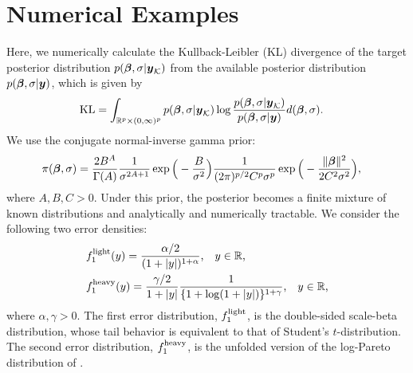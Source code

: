 \documentclass[12pt]{article}
\def\si{{\sigma}}
\def\Ga{\Gamma}
\def\al{{\alpha}}
\def\ga{{\gamma}}
\def\si{{\sigma}}
\def\Ga{{\Gamma}}
\def\non{{\nonumber}}
\def\Kc{{\cal K}}
\def\al{{\alpha}}
\def\ga{{\gamma}}
\def\si{{\sigma}}
\def\bbe{{\text{\boldmath $\beta$}}}
\def\Ga{{\Gamma}}
\def\y{{\text{\boldmath $y$}}}
\def\Kc{{\cal K}}
\def\non{{\nonumber}}
\begin{document}
\section{Numerical Examples}
\label{sec:example} 
Here, we numerically calculate the Kullback-Leibler (KL) divergence of the target posterior distribution $p( \bbe , \si | \y _{\Kc } )$ from the available posterior distribution $p( \bbe , \si | \y )$, which is given by 
\begin{align}
&{\rm{KL}} = \int_{\mathbb{R} ^p \times (0, \infty )^p} p( \bbe , \si | \y _{\Kc } ) \log {p( \bbe , \si | \y _{\Kc } ) \over p( \bbe , \si | \y )} d( \bbe , \si ) \text{.} \non 
\end{align}
We use the conjugate normal-inverse gamma prior: 
\begin{align}
\pi ( \bbe , \si ) &= {2 B^A \over \Ga (A)} {1 \over \si ^{2 A + 1}} \exp \Big( - {B \over \si ^2} \Big) {1 \over (2 \pi )^{p / 2} C^p \si ^p} \exp \Big( - {\| \bbe \| ^2 \over 2 C^2 \si ^2} \Big) \text{,} \non 
\end{align}
where $A, B, C > 0$. 
Under this prior, the posterior becomes a finite mixture of known distributions and analytically and numerically tractable. 
%
We consider the following two error densities: 
\begin{align}
&f_{1}^{\rm{light}} (y) = {\al / 2 \over (1 + |y|)^{1 + \al }} \text{,} \quad y \in \mathbb{R} \text{,} \non \\
&f_{1}^{\rm{heavy}} (y) = {\ga / 2 \over 1 + |y|} {1 \over \{ 1 + \log (1 + |y|) \} ^{1 + \ga }} \text{,} \quad y \in \mathbb{R} \text{,} \non 
\end{align}
where $\al , \ga > 0$. 
The first error distribution, $f_{1}^{\rm{light}}$, is the double-sided scale-beta distribution, whose tail behavior is equivalent to that of Student's $t$-distribution. The second error distribution, $f_{1}^{\rm{heavy}}$, is the unfolded version of the log-Pareto distribution of \cite{cormann2009generalizing}. %
\end{document}
